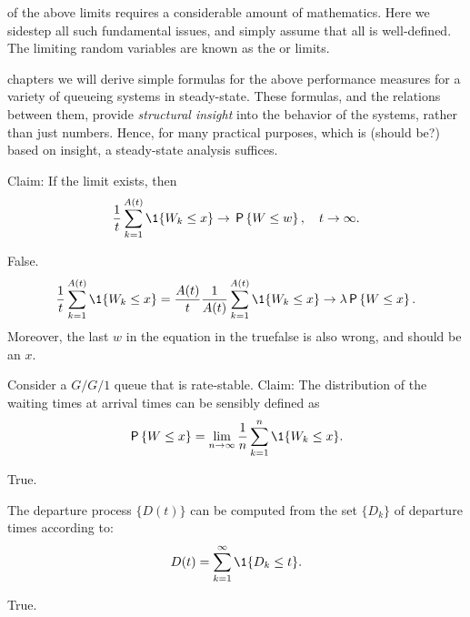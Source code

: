 \documentclass[stochastic-or.tex]{subfiles}
\begin{document}
 of the above limits requires a considerable amount of mathematics.
Here we sidestep all such fundamental issues, and simply assume that all is well-defined.
The limiting random variables are known as the  or  limits.

 chapters we will derive simple formulas for the above performance measures for a variety of queueing systems in steady-state.
These formulas, and the relations between them, provide \emph{structural insight} into the behavior of the systems, rather than just numbers.
Hence, for many practical purposes, which is (should be?) based on insight, a steady-state analysis suffices.

\begin{truefalse}
Claim: If the limit exists, then
\begin{equation*}
 \frac{1}{t} \sum_{k=1}^{A(t)} \1{W_k \leq x} \to \P{W\leq w}, \quad t\to \infty.
\end{equation*}
\begin{solution}
False.
\begin{equation*}
 \frac{1}{t} \sum_{k=1}^{A(t)} \1{W_k \leq x} =
 \frac{A(t)}{t} \frac 1{A(t)}\sum_{k=1}^{A(t)} \1{W_k \leq x} \to \lambda \P{W\leq x}.
\end{equation*}
Moreover, the last $w$ in the equation in the truefalse is also wrong, and should be an $x$.
\end{solution}
\end{truefalse}

\begin{truefalse}
Consider a $G/G/1$ queue that is rate-stable. Claim: The distribution of the waiting times at
 arrival times can be sensibly defined as
\begin{equation*}
 \P{W \leq x} = \lim_{n\to\infty} \frac 1n\sum_{k=1}^n \1{W_k\leq x}.
\end{equation*}
\begin{solution}
True.
\end{solution}
\end{truefalse}

\begin{truefalse}
The departure process $\{D(t)\}$ can be computed from the set $\{D_k\}$ of departure times according to:
\begin{equation*}
 D(t) = \sum_{k=1}^\infty \1{D_k \leq t}.
\end{equation*}

\begin{solution}
True.
\end{solution}
\end{truefalse}
\end{document}
